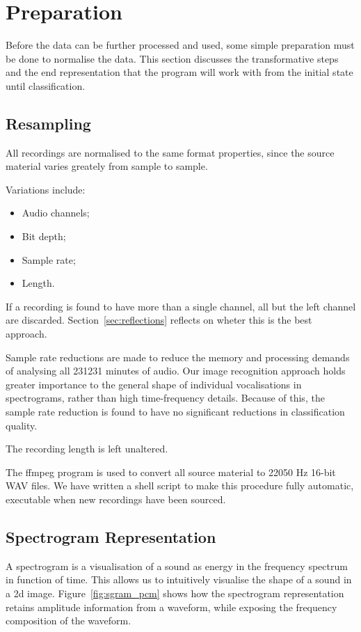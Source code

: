 \section{Preparation}\label{sec:prep}
Before the data can be further processed and used, some simple preparation
must be done to normalise the data.
This section discusses the transformative steps and the end representation that
the program will work with from the initial state until classification.

\subsection{Resampling}
All recordings are normalised to the same format properties, since the source
material varies greately from sample to sample.

Variations include:
\begin{itemize}[noitemsep]
  \item Audio channels;
  \item Bit depth;
  \item Sample rate;
  \item Length.
\end{itemize}

If a recording is found to have more than a single channel, all but the left
channel are discarded.
Section~\ref{sec:reflections} reflects on wheter this is the best approach.

Sample rate reductions are made to reduce the memory and processing demands of
analysing all 231231 minutes of audio.
Our image recognition approach holds greater importance to the general shape
of individual vocalisations in spectrograms, rather than high time-frequency
details.
Because of this, the sample rate reduction is found to have no significant
reductions in classification quality.

The recording length is left unaltered.

The ffmpeg program is used to convert all source material to 22050 Hz 16-bit
WAV files.
We have written a shell script to make this procedure fully automatic, executable
when new recordings have been sourced.


\subsection{Spectrogram Representation}
A spectrogram is a visualisation of a sound as energy in the frequency spectrum
in function of time.
This allows us to intuitively visualise the shape of a sound in a 2d image.
Figure~\ref{fig:sgram_pcm} shows how the spectrogram representation retains
amplitude information from a waveform, while exposing the frequency composition
of the waveform.

